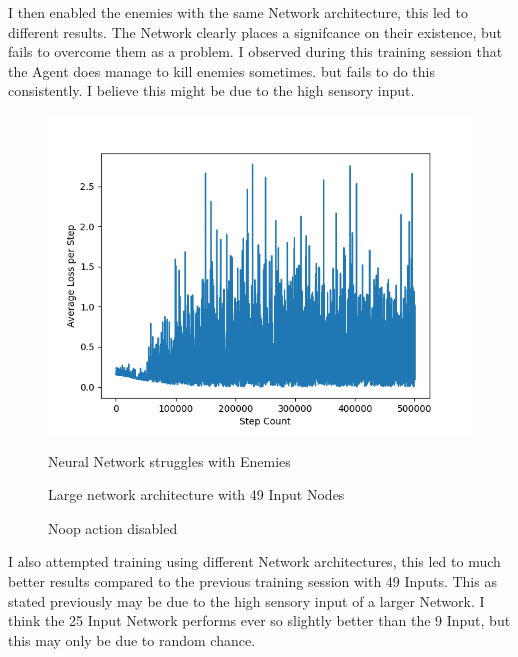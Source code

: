 \begin{flushleft}
        I then enabled the enemies with the same Network architecture, this led to different results. The Network clearly places a signifcance on their
        existence, but fails to overcome them as a problem. I observed during this training session that the Agent does manage to kill enemies sometimes.
        but fails to do this consistently. I believe this might be due to the high sensory input.

        \begin{figure}[H]
            \centering
            \includegraphics[width=12cm]{Images/Evaluation/EnemiesEnabled.png}
            \caption*{Neural Network struggles with Enemies}
            \caption*{Large network architecture with 49 Input Nodes} 
            \caption*{Noop action disabled}
        \end{figure}

        I also attempted training using different Network architectures, this led to much better results compared to the previous training session with 49 Inputs.
        This as stated previously may be due to the high sensory input of a larger Network. I think the 25 Input Network performs ever so slightly better than
        the 9 Input, but this may only be due to random chance.


\end{flushleft}
